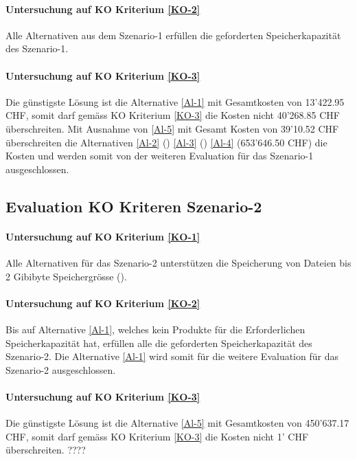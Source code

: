 \paragraph*{Untersuchung auf KO Kriterium \ref{KO-2}}
Alle Alternativen aus dem Szenario-1 erfüllen die geforderten Speicherkapazität des Szenario-1.

\paragraph*{Untersuchung auf KO Kriterium \ref{KO-3}}
Die günstigste Lösung ist die Alternative \ref{Al-1} mit Gesamtkosten von 13'422.95 CHF, somit darf gemäss KO Kriterium \ref{KO-3} die Kosten nicht 40'268.85 CHF überschreiten. Mit Ausnahme von \ref{Al-5} mit Gesamt Kosten von 39'10.52 CHF überschreiten die Alternativen \ref{Al-2} () \ref{Al-3} () \ref{Al-4} (653’646.50 CHF) die Kosten und werden somit von der weiteren Evaluation für das Szenario-1 ausgeschlossen.

\subsection{Evaluation KO Kriteren Szenario-2}

\paragraph*{Untersuchung auf KO Kriterium \ref{KO-1}}
Alle Alternativen für das Szenario-2 unterstützen die Speicherung von Dateien bis 2 Gibibyte Speichergrösse ().

\paragraph*{Untersuchung auf KO Kriterium \ref{KO-2}}
Bis auf Alternative \ref{Al-1}, welches kein Produkte für die Erforderlichen Speicherkapazität hat, erfüllen alle die geforderten Speicherkapazität  des Szenario-2. Die Alternative \ref{Al-1} wird somit für die weitere Evaluation für das Szenario-2 ausgeschlossen.

\paragraph*{Untersuchung auf KO Kriterium \ref{KO-3}}
Die günstigste Lösung ist die Alternative \ref{Al-5} mit Gesamtkosten von 450'637.17 CHF, somit darf gemäss KO Kriterium \ref{KO-3} die Kosten nicht 1' CHF überschreiten. ????

